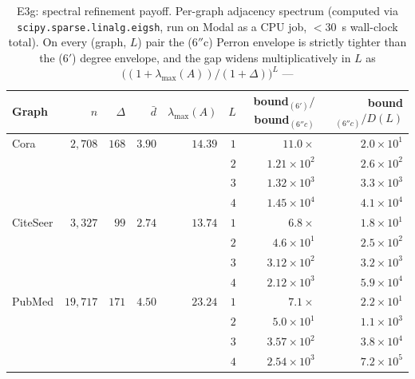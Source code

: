 \documentclass[10pt]{article}
\theoremstyle{definition}
\theoremstyle{remark}
\begin{document}
\begin{table}[h]\centering\small
\begin{tabular}{lrrrrrrr}
\toprule
Graph & $n$ & $\Delta$ & $\bar d$ & $\lambda_{\max}(A)$
      & $L$ & bound$_{(6')}/$bound$_{(6''\!c)}$
      & bound$_{(6''\!c)}/D(L)$ \\
\midrule
Cora     & $2{,}708$  & $168$ & $3.90$ & $14.39$
                                       & $1$ & $11.0\times$               & $2.0\!\times\!10^{1}$ \\
         &            &       &        &     & $2$ & $1.21\!\times\!10^{2}$ & $2.6\!\times\!10^{2}$ \\
         &            &       &        &     & $3$ & $1.32\!\times\!10^{3}$ & $3.3\!\times\!10^{3}$ \\
         &            &       &        &     & $4$ & $1.45\!\times\!10^{4}$ & $4.1\!\times\!10^{4}$ \\
CiteSeer & $3{,}327$  & $99$  & $2.74$ & $13.74$
                                       & $1$ & $6.8\times$                & $1.8\!\times\!10^{1}$ \\
         &            &       &        &     & $2$ & $4.6\!\times\!10^{1}$  & $2.5\!\times\!10^{2}$ \\
         &            &       &        &     & $3$ & $3.12\!\times\!10^{2}$ & $3.2\!\times\!10^{3}$ \\
         &            &       &        &     & $4$ & $2.12\!\times\!10^{3}$ & $5.9\!\times\!10^{4}$ \\
PubMed   & $19{,}717$ & $171$ & $4.50$ & $23.24$
                                       & $1$ & $7.1\times$                & $2.2\!\times\!10^{1}$ \\
         &            &       &        &     & $2$ & $5.0\!\times\!10^{1}$  & $1.1\!\times\!10^{3}$ \\
         &            &       &        &     & $3$ & $3.57\!\times\!10^{2}$ & $3.8\!\times\!10^{4}$ \\
         &            &       &        &     & $4$ & $2.54\!\times\!10^{3}$ & $7.2\!\times\!10^{5}$ \\
\bottomrule
\end{tabular}
\caption{E3g: spectral refinement payoff. Per-graph adjacency
spectrum (computed via \texttt{scipy.sparse.linalg.eigsh}, run
on Modal as a CPU job, $<30$~s wall-clock total). On every
(graph, $L$) pair the (6$''$c) Perron envelope is strictly
tighter than the (6$'$) degree envelope, and the gap widens
multiplicatively in $L$ as
$\bigl((1{+}\lambda_{\max}(A))/(1{+}\Delta)\bigr)^{L}$ ---
}
\end{table}
\end{document}
